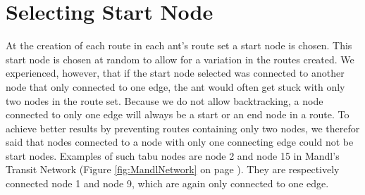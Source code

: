 \section{Selecting Start Node}

At the creation of each route in each ant's route set a start node is chosen. This start node is chosen at random to allow for a variation in the routes created. We experienced, however, that if the start node selected was connected to another node that only connected to one edge, the ant would often get stuck with only two nodes in the route set. Because we do not allow backtracking, a node connected to only one edge will always be a start or an end node in a route. To achieve better results by preventing routes containing only two nodes, we therefor said that nodes connected to a node with only one connecting edge could not be start nodes. Examples of such tabu nodes are node 2 and node 15 in Mandl's Transit Network (Figure \ref{fig:MandlNetwork} on page \pageref{fig:MandlNetwork}). They are respectively connected node 1 and node 9, which are again only connected to one edge. 
